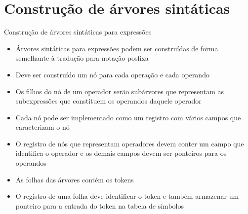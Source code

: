 \section{Construção de árvores sintáticas}

\begin{frame}[fragile]{Construção de árvores sintáticas para expressões}

    \begin{itemize}
        \item Árvores sintáticas para expressões podem ser construídas de forma semelhante à tradução para notação posfixa

        \item Deve ser construído um nó para cada operação e cada operando

        \item Os filhos do nó de um operador serão subárvores que representam as subexpressões que constituem os operandos daquele operador

        \item Cada nó pode ser implementado como um registro com vários campos que caracterizam o nó

        \item O registro de nós que representam operadores devem conter um campo que identifica o operador e os demais campos devem ser ponteiros para os
            operandos

        \item As folhas das árvores contém os tokens

        \item O registro de uma folha deve identificar o token e também armazenar um ponteiro para a entrada do token na tabela de símbolos
    \end{itemize}

\end{frame}

